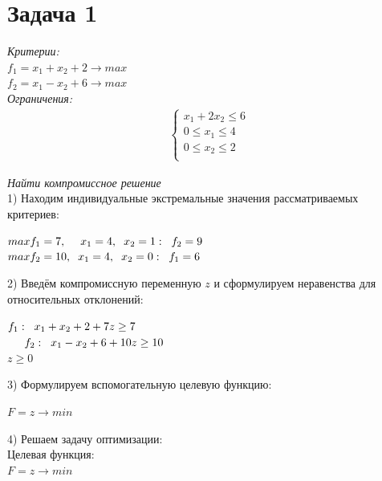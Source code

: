 \documentclass[14pt,fleqn]{extarticle}
\begin{document}
	\section*{Задача 1}
	\textit{Критерии:}\\
	$f_1 = x_1 + x_2 + 2 \longrightarrow max$\\
	$f_2 = x_1 - x_2 + 6 \longrightarrow max$\\
	
	\textit{Ограничения:}
	\begin{align*}
		\begin{cases}
			x_1 + 2x_2 \leq 6\\
			0 \leq x_1 \leq 4\\
			0 \leq x_2 \leq 2\\
		\end{cases}
	\end{align*}
	
	\textit{Найти компромиссное решение}\\
	
	1) Находим индивидуальные экстремальные значения рассматриваемых критериев:
	\begin{center}
		$max f_1 = 7, \hspace{0.45cm} x_1 = 4, \hspace{0.2cm} x_2 = 1: \hspace{0.2cm} f_2 = 9$\\
		$max f_2 = 10, \hspace{0.2cm} x_1 = 4, \hspace{0.2cm} x_2 = 0: \hspace{0.2cm} f_1 = 6$
	\end{center}

	2) Введём компромиссную переменную $z$ и сформулируем неравенства для относительных отклонений:
	\begin{center}
		$f_1: \hspace{0.2cm} x_1 + x_2 + 2 + 7z \geq 7$\\
		$\hspace{0.52cm} f_2: \hspace{0.2cm} x_1 - x_2 + 6 + 10z \geq 10$\\
		$z \geq 0$
	\end{center}
	3) Формулируем вспомогательную целевую функцию:
	\begin{center}
		$F = z \longrightarrow min$
	\end{center}
	4) Решаем задачу оптимизации:\\
	
	Целевая функция:\\
	$F = z \longrightarrow min$\\
	
\end{document}
